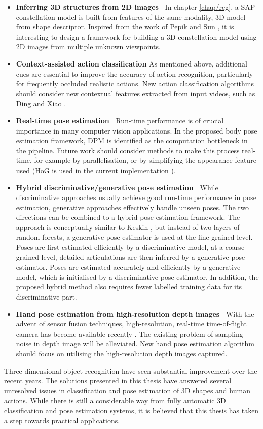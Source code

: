 \begin{itemize}
	\item \textbf{Inferring 3D structures from 2D images~} 
		In chapter \ref{chap/reg}, a SAP constellation model is built from features of the same modality, \eg 3D model from shape descriptor. Inspired from the work of Pepik \etal \cite{Pepik2012} and Sun \etal \cite{Sun2009}, it is interesting to design a framework for building a 3D constellation model using 2D images from multiple unknown viewpoints.  
	\item \textbf{Context-assisted action classification} As mentioned above, additional cues are essential to improve the accuracy of action recognition, particularly for frequently occluded realistic actions. New action classification algorithms should consider new contextual features extracted from input videos, such as Ding and Xiao \cite{Ding2012}.   
	\item \textbf{Real-time pose estimation~} Run-time performance is of crucial importance in many computer vision applications. In the proposed body pose estimation framework, DPM is identified as the computation bottleneck in the pipeline. Future work should consider methods to make this process real-time, for example by parallelisation, or by simplifying the appearance feature used (HoG is used in the current implementation \cite{Yang2011}).  
	\item \textbf{Hybrid discriminative/generative pose estimation~} While discriminative approaches usually achieve good run-time performance in pose estimation, generative approaches effectively handle unseen poses. The two directions can be combined to a hybrid pose estimation framework. The approach is conceptually similar to Keskin \etal \cite{Keskin2012}, but instead of two layers of random forests, a generative pose estimator is used at the fine grained level. Poses are first estimated efficiently by a discriminative model, at a coarse-grained level, detailed articulations are then inferred by a generative pose estimator. Poses are estimated accurately and efficiently by a generative model, which is initialised by a discriminative pose estimator. In addition, the proposed hybrid method also requires fewer labelled training data for its discriminative part. 
	\item \textbf{Hand pose estimation from high-resolution depth images~} With the advent of sensor fusion techniques, high-resolution, real-time time-of-flight camera has become available recently \cite{Nair2012}. The existing problem of sampling noise in depth image will be alleviated. New hand pose estimation algorithm should focus on utilising the high-resolution depth images captured.    
\end{itemize}

Three-dimensional object recognition have seen substantial improvement over the recent years.
The solutions presented in this thesis have answered several unresolved issues in classification and pose estimation of 3D shapes and human actions. While there is still a considerable way from fully automatic 3D classification and pose estimation systems, it is believed that this thesis has taken a step towards practical applications.  
